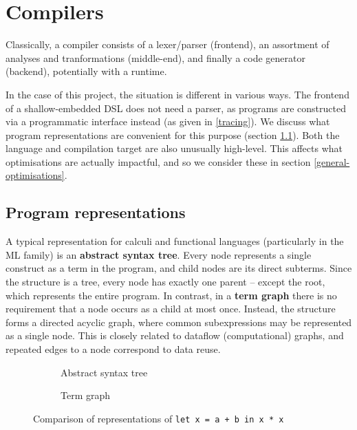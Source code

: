 \section{Compilers}

Classically, a compiler consists of a lexer/parser (frontend), an assortment of analyses and tranformations (middle-end), and finally a code generator (backend), potentially with a runtime. 

In the case of this project, the situation is different in various ways. The frontend of a shallow-embedded DSL does not need a parser, as programs are constructed via a programmatic interface instead (as given in \ref{tracing}). We discuss what program representations are convenient for this purpose (section \ref{representations}). Both the language and compilation target are also unusually high-level. This affects what optimisations are actually impactful, and so we consider these in section \ref{general-optimisations}.

\subsection{Program representations} \label{representations}

A typical representation for calculi and functional languages (particularly in the ML family) is an \textbf{abstract syntax tree}. 
Every node represents a single construct as a term in the program, and child nodes are its direct subterms. 
Since the structure is a tree, every node has exactly one parent -- except the root, which represents the entire program. 
In contrast, in a \textbf{term graph} there is no requirement that a node occurs as a child at most once. 
Instead, the structure forms a directed acyclic graph, where common subexpressions may be represented as a single node. This is closely related to dataflow (computational) graphs, and repeated edges to a node correspond to data reuse.

\begin{figure}[ht]
\centering
\begin{subfigure}{.4\textwidth}
  \caption{Abstract syntax tree}
\end{subfigure}%
\begin{subfigure}{.4\textwidth}
  \caption{Term graph}
\end{subfigure}
\caption{Comparison of representations of \texttt{let x = a + b in x * x}}
\label{fig:term-repr}
\end{figure}

